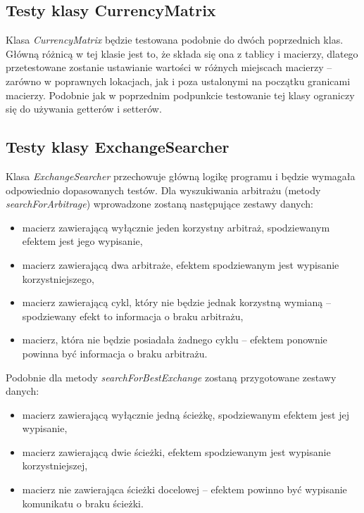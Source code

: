 \documentclass[a4paper,11pt]{article}
\newcommand\tab[1][0.6cm]{\hspace*{#1}}
\begin{document}
\subsection{Testy klasy CurrencyMatrix}

\tab Klasa \textit{CurrencyMatrix} będzie testowana podobnie do dwóch poprzednich klas. Główną różnicą w tej klasie jest to, że składa się ona z tablicy i macierzy, dlatego przetestowane zostanie ustawianie wartości w różnych miejscach macierzy -- zarówno w poprawnych lokacjach, jak i poza ustalonymi na początku granicami macierzy. Podobnie jak w poprzednim podpunkcie testowanie tej klasy ograniczy się do używania getterów i setterów.

\subsection{Testy klasy ExchangeSearcher}

\tab Klasa \textit{ExchangeSearcher} przechowuje główną logikę programu i będzie wymagała odpowiednio dopasowanych testów. Dla wyszukiwania arbitrażu (metody \textit{searchForArbitrage}) wprowadzone zostaną następujące zestawy danych: 

\begin{itemize}
\item macierz zawierającą wyłącznie jeden korzystny arbitraż, spodziewanym efektem jest jego wypisanie,
\item macierz zawierającą dwa arbitraże, efektem spodziewanym jest wypisanie korzystniejszego,
\item macierz zawierającą cykl, który nie będzie jednak korzystną wymianą -- spodziewany efekt to informacja o braku arbitrażu,
\item macierz, która nie będzie posiadała żadnego cyklu -- efektem ponownie powinna być informacja o braku arbitrażu.
\end{itemize}

Podobnie dla metody \textit{searchForBestExchange} zostaną przygotowane zestawy danych: 

\begin{itemize}
\item macierz zawierającą wyłącznie jedną ścieżkę, spodziewanym efektem jest jej wypisanie,
\item macierz zawierającą dwie ścieżki, efektem spodziewanym jest wypisanie korzystniejszej,
\item macierz nie zawierająca ścieżki docelowej -- efektem powinno być wypisanie komunikatu o braku ścieżki.
\end{itemize}
\end{document}
